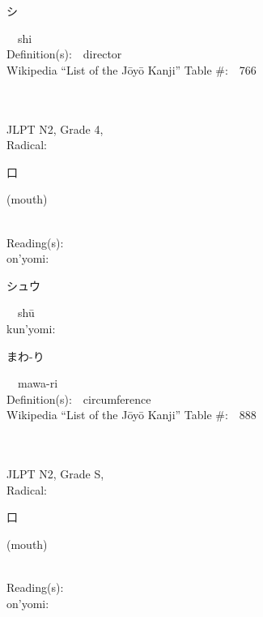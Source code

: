 \begin{multicols}{2}
{\hspace*{2em}}{\begin{CJK}{UTF8}{min} シ \end{CJK}}\ \ shi\ \ \\
Definition(s):\ \ director \\
Wikipedia ``List of the J\=oy\=o Kanji'' Table \#:\ \ 766 \\
\ \ \\
{\fontsize{34pt}{40pt}  }\ \ \\  %
{JLPT N2, Grade 4, \\Radical:\ \ {\begin{CJK}{UTF8}{min} 口 \end{CJK}} (mouth) } \\
Reading(s):\ \ \\
{\hspace*{1em}}on'yomi:\ \ \\
{\hspace*{2em}}{\begin{CJK}{UTF8}{min} シュウ \end{CJK}}\ \ sh\=u\ \ \\
{\hspace*{1em}}kun'yomi:\ \ \\
{\hspace*{2em}}{\begin{CJK}{UTF8}{min} まわ-り \end{CJK}}\ \ mawa-ri\ \ \\
Definition(s):\ \ circumference \\
Wikipedia ``List of the J\=oy\=o Kanji'' Table \#:\ \ 888 \\
\ \ \\
{\fontsize{34pt}{40pt}  }\ \ \\  %
{JLPT N2, Grade S, \\Radical:\ \ {\begin{CJK}{UTF8}{min} 口 \end{CJK}} (mouth) } \\
Reading(s):\ \ \\
{\hspace*{1em}}on'yomi:\ \ \\

\end{multicols}
